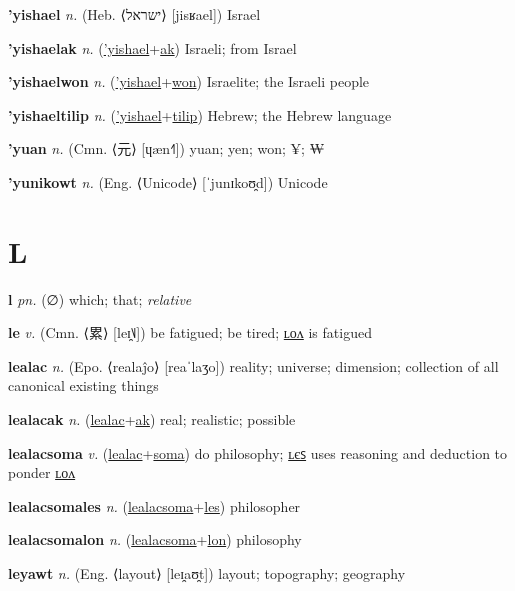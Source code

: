 \textbf{\hypertarget{'yishael}{'yishael}} \textit{n.} (Heb. ⟨{\hebrew{}ישראל}⟩ [jisʁael])
Israel

\textbf{\hypertarget{'yishaelak}{'yishaelak}} \textit{n.} (\hyperlink{'yishael}{'yishael}+\allowbreak \hyperlink{ak}{ak})
Israeli; from Israel

\textbf{\hypertarget{'yishaelwon}{'yishaelwon}} \textit{n.} (\hyperlink{'yishael}{'yishael}+\allowbreak \hyperlink{won}{won})
Israelite; the Israeli people

\textbf{\hypertarget{'yishaeltilip}{'yishaeltilip}} \textit{n.} (\hyperlink{'yishael}{'yishael}+\allowbreak \hyperlink{tilip}{tilip})
Hebrew; the Hebrew language

\textbf{\hypertarget{'yuan}{'yuan}} \textit{n.} (Cmn. ⟨{\chinese{}元}⟩ [ɥæn˧˥])
yuan; yen; won; ¥; ₩

\textbf{\hypertarget{'yunikowt}{'yunikowt}} \textit{n.} (Eng. ⟨Unicode⟩ [ˈjunɪkoʊ̯d])
Unicode

\section{L}

\textbf{\hypertarget{l}{l}} \textit{pn.} (∅)
which; that; \textit{relative}

\textbf{\hypertarget{le}{le}} \textit{v.} (Cmn. ⟨{\chinese{}累}⟩ [leɪ̯˥˩])
be fatigued; be tired; \hyperlink{lelon}{ʟᴏᴧ} is fatigued

\textbf{\hypertarget{lealac}{lealac}} \textit{n.} (Epo. ⟨realaĵo⟩ [reaˈlaʒo])
reality; universe; dimension; collection of all canonical existing things

\textbf{\hypertarget{lealacak}{lealacak}} \textit{n.} (\hyperlink{lealac}{lealac}+\allowbreak \hyperlink{ak}{ak})
real; realistic; possible

\textbf{\hypertarget{lealacsoma}{lealacsoma}} \textit{v.} (\hyperlink{lealac}{lealac}+\allowbreak \hyperlink{soma}{soma})
do philosophy; \hyperlink{lealacsomales}{ʟєꜱ} uses reasoning and deduction to ponder \hyperlink{lealacsomalon}{ʟᴏᴧ}

\textbf{\hypertarget{lealacsomales}{lealacsomales}} \textit{n.} (\hyperlink{lealacsoma}{lealacsoma}+\allowbreak \hyperlink{les}{les})
philosopher

\textbf{\hypertarget{lealacsomalon}{lealacsomalon}} \textit{n.} (\hyperlink{lealacsoma}{lealacsoma}+\allowbreak \hyperlink{lon}{lon})
philosophy

\textbf{\hypertarget{leyawt}{leyawt}} \textit{n.} (Eng. ⟨layout⟩ [leɪ̯aʊ̯t])
layout; topography; geography

